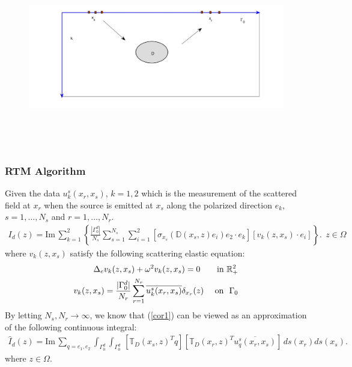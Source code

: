 \documentclass[cjk,8pt]{beamer}
\newcommand{\R}{\mathbb{R}}
\renewcommand{\Im}{\mathrm{Im}\,}
\newcommand{\Ga}{\Gamma}
\newcommand{\Om}{\Omega}
\renewcommand{\Im}{\mathrm{Im}\,}
\newcommand{\D}{\mathbb{D}}
\newcommand{\T}{\mathbb{T}}
\newcommand{\be}{\begin{eqnarray}}
\newcommand{\ee}{\end{eqnarray}}
\newcommand{\ben}{\begin{eqnarray*}}
\newcommand{\een}{\end{eqnarray*}}
\begin{document}
\begin{CJK*}{GBK}{kai}
\begin{frame}
\begin{figure}
  \centering
  \includegraphics[width=12cm,height=8cm]{./figure/half_forward}
\end{figure}
\end{frame}
\begin{frame}
\frametitle{RTM Algorithm}
Given the data $u_k^s(x_r,x_s)$, $k=1,2$ which is the measurement of the scattered field at $x_r$ when the source is emitted at $x_s$ along the  polarized direction $e_k$, $s=1,\dots, N_s$ and $r=1,\dots,N_r$.
\be\label{cor1}
I_d(z)=\Im\sum_{k=1}^{2}\left\{\frac{|\Gamma_0^d|}{N_s}\sum^{N_s}_{s=1}\sum_{i=1}^{2}[\sigma_{x_s}(\D(x_s,z)e_i)e_2\cdot e_k][v_k(z,x_s)\cdot e_i]\right\}. \ \ z\in \Omega
\ee
where $v_k(z,x_s)$ satisfy the following scattering elastic equation:
\ben
\Delta_e v_k(z,x_s) + \omega^2 v_k(z,x_s) =0 \qquad\mbox{\rm in } \R^2_+ \\
v_k(z,x_s)=\frac{|\Ga_0^d|}{N_r}\sum_{r=1}^{N_r}\overline{u^s_k(x_r,x_s)}\delta_{x_r}(z) \ \ \ \ \mbox{\rm on}  \ \ \Ga_0
\een
By letting $N_s,N_r\to\infty$, we know that (\ref{cor1}) can be viewed as an approximation of the following continuous integral:
\ben
\hat{I}_d(z)=\Im\sum_{q=e_1,e_2}\int_{\Gamma_0^d}\int_{\Gamma_0^d}\,
[\T_D(x_s,z)^Tq][\T_D(x_r,z)^T\overline{u^s_q(x_r,x_s)}]\,ds(x_r)ds(x_s).
\een
where $z\in\Om$.
\end{frame}



\end{CJK*}
\end{document}
